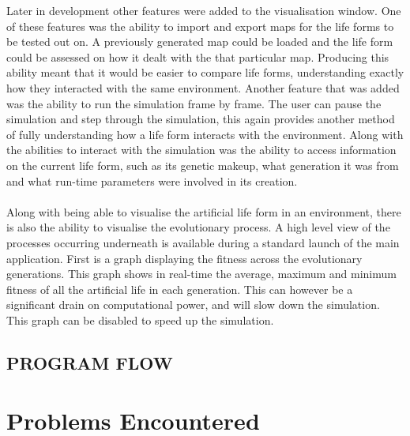 \documentclass[12pt]{article}
\begin{document}
Later in development other features were added to the visualisation window. One of these features was the ability to import and export maps for the life forms to be
tested out on. A previously generated map could be loaded and the life form could be assessed on how it dealt with the that particular map. Producing this ability meant that it would be easier to compare life forms, understanding exactly how they interacted with the same environment.
Another feature that was added was the ability to run the simulation frame by frame. The user can pause the simulation and step through the simulation, this again provides another method of fully understanding how a life form interacts with the environment. 
Along with the abilities to interact with the simulation was the ability to access information on the current life form, such as its genetic 
makeup, what generation it was from and what run-time parameters were involved in its creation.

\paragraph{}
Along with being able to visualise the artificial life form in an environment, there is also the ability to visualise the
evolutionary process. A high level view of the processes occurring underneath is available during a standard launch of the
main application. First is a graph displaying the fitness across the evolutionary generations. This graph shows in real-time the
average, maximum and minimum fitness of all the artificial life in each generation.
This can however be a significant drain on computational power, and will slow down the simulation. This graph can be disabled to speed up
the simulation. 

\subsection{PROGRAM FLOW}

\section{Problems Encountered}
\end{document}
